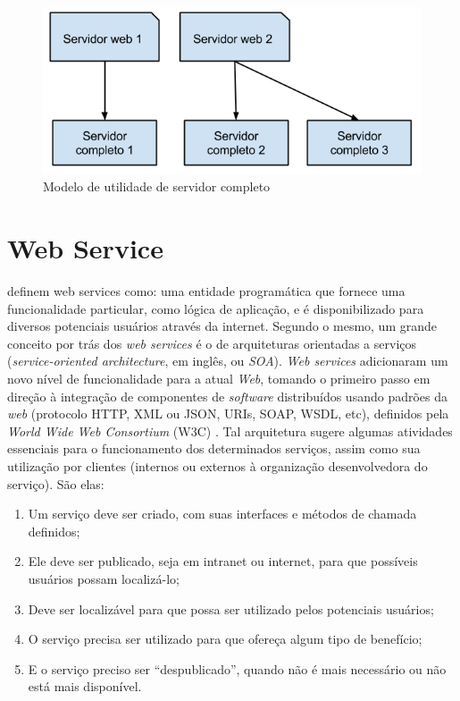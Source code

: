 \begin{figure}[h]
  \center
  \includegraphics[scale=0.7]{imagem/utilidade-servidor-completo.png}
  \caption{Modelo de utilidade de servidor completo}
  \label{img:utilidade-servidor-completo}
\end{figure}

\section{Web Service}

 definem
web services como: uma entidade programática que fornece uma funcionalidade particular, como
lógica de aplicação, e é disponibilizado para diversos potenciais usuários através da internet.
Segundo o mesmo, um grande conceito por trás dos \emph{web services} é o de arquiteturas orientadas
a serviços (\textit{service-oriented architecture}, em inglês, ou \emph{SOA}).
\textit{Web services} adicionaram um novo nível de funcionalidade para a atual \textit{Web},
tomando o primeiro passo em direção à integração de componentes de \emph{software} distribuídos
usando padrões da \emph{web} (protocolo HTTP, XML ou JSON, URIs, SOAP, WSDL, etc), definidos pela
\emph{World Wide Web Consortium} (W3C) \cite{book-web-services}.
Tal arquitetura sugere algumas atividades essenciais para o funcionamento dos determinados serviços, assim
como sua utilização por clientes (internos ou externos à organização desenvolvedora do serviço). São elas:

\begin{enumerate}
    \item
        Um serviço deve ser criado, com suas interfaces e métodos de chamada definidos;

    \item
        Ele deve ser publicado, seja em intranet ou internet, para que possíveis
        usuários possam localizá-lo;

    \item
        Deve ser localizável para que possa ser utilizado pelos potenciais usuários;

    \item
        O serviço precisa ser utilizado para que ofereça algum tipo de benefício;

    \item
        E o serviço preciso ser ``despublicado'', quando não é mais necessário ou não
        está mais disponível.
\end{enumerate}

